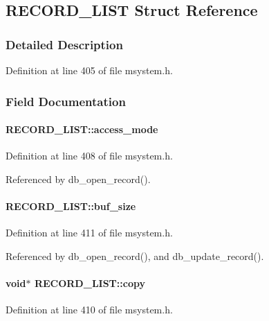 \subsection{RECORD\_\-LIST Struct Reference}
\label{structRECORD__LIST}


\subsubsection{Detailed Description}


Definition at line 405 of file msystem.h.

\subsubsection{Field Documentation}
\paragraph[{access\_\-mode}]{ {\bf RECORD\_\-LIST::access\_\-mode}}\hfill\label{structRECORD__LIST_a1e751bc72ec53754264476baa2d3da1a}


Definition at line 408 of file msystem.h.

Referenced by db\_\-open\_\-record().
\paragraph[{buf\_\-size}]{ {\bf RECORD\_\-LIST::buf\_\-size}}\hfill\label{structRECORD__LIST_a5509b7cedf38e09f10b29a76eac9af20}


Definition at line 411 of file msystem.h.

Referenced by db\_\-open\_\-record(), and db\_\-update\_\-record().
\paragraph[{copy}]{\setlength{\rightskip}{0pt plus 5cm}void$\ast$ {\bf RECORD\_\-LIST::copy}}\hfill\label{structRECORD__LIST_ab69e1a571bb5864254923c76aef72d10}


Definition at line 410 of file msystem.h.

